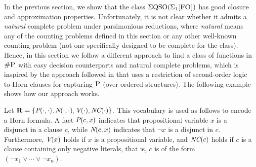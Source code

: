 In the previous section, we show that the class $\Sigma{\rm QSO}(\Sigma_{1}\textsc{[FO]})$ has good closure and approximation properties. Unfortunately, it is not clear whether it admits a {\em natural} complete problem under parsimonious reductions, where {\em natural} means any of the counting problems defined in this section or any other well-known counting problem (not one specifically designed to be complete for the class). Hence, in this section we follow a different approach to find a class of functions in $\text{\sc \#P}$ with easy decision counterparts and natural complete problems, which is inspired by the approach followed in \cite{G92} that uses a restriction of second-order logic to Horn clauses for capturing $\text{\sc P}$ (over ordered structures). The following example shows how our approach works.
\begin{example} \label{ex-hornsat-esop1}
Let $\mathbf{R} = \{\textit{P}(\cdot,\cdot), \textit{N}(\cdot,\cdot), \textit{V}(\cdot), \textit{NC}(\cdot)\}$. This vocabulary is used as follows to encode a Horn formula. A fact $\textit{P}(c,x)$ indicates that propositional variable $x$ is a disjunct in a clause $c$, while $\textit{N}(c,x)$ indicates that $\neg x$ is a disjunct in $c$. Furthermore, $\textit{V}(x)$ holds if  $x$ is a propositional variable, and $\textit{NC}(c)$ holds if $c$ is a clause containing only negative literals, that is, $c$ is of the form $(\neg x_1 \vee \cdots \vee \neg x_n)$.


\end{example}
